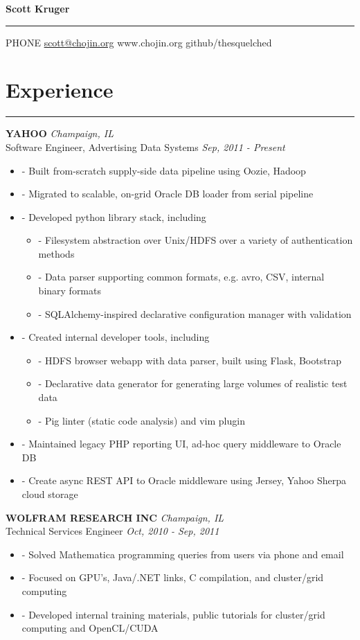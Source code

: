 \documentclass[a4paper,11pt]{article}
\newenvironment{pitemize}{
\begin{itemize}
\setlength{\itemsep}{.01in}
\setlength{\parskip}{.01in}
}
{\end{itemize}}
\begin{document}
\Huge{\textbf{Scott Kruger}}
\hrule
\vspace{0.05in}
\normalsize{
    PHONE \hfill \href{mailto:scott@chojin.org}{scott@chojin.org} 
    \hfill www.chojin.org \hfill github/thesquelched
}

\section*{\huge{Experience}}
\hrule
\vspace{0.1in}

\textbf{YAHOO} \hfill \textit{Champaign, IL} \\
Software Engineer, Advertising Data Systems \hfill \textit{Sep, 2011 - Present}
\begin{pitemize}
    \item[-]Built from-scratch supply-side data pipeline using Oozie, Hadoop
    \item[-]Migrated to scalable, on-grid Oracle DB loader from serial pipeline
    \item[-]Developed python library stack, including
    \begin{pitemize}
        \item[-]Filesystem abstraction over Unix/HDFS over a variety of authentication methods
        \item[-]Data parser supporting common formats, e.g. avro, CSV, internal binary formats
        \item[-]SQLAlchemy-inspired declarative configuration manager with validation
    \end{pitemize}
    \item[-]Created internal developer tools, including
    \begin{pitemize}
        \item[-]HDFS browser webapp with data parser, built using Flask, Bootstrap
        \item[-]Declarative data generator for generating large volumes of realistic test data
        \item[-]Pig linter (static code analysis) and vim plugin
    \end{pitemize}
    \item[-]Maintained legacy PHP reporting UI, ad-hoc query middleware to Oracle DB
    \item[-]Create async REST API to Oracle middleware using Jersey, Yahoo Sherpa cloud storage
\end{pitemize}

\vspace{0.2in}
\textbf{WOLFRAM RESEARCH INC} \hfill \textit{Champaign, IL} \\
Technical Services Engineer \hfill \textit{Oct, 2010 - Sep, 2011}
\begin{pitemize}
\item[-]Solved Mathematica programming queries from users via phone and email
\item[-]Focused on GPU's, Java/.NET links, C compilation, and cluster/grid computing
\item[-]Developed internal training materials, public tutorials for cluster/grid computing and OpenCL/CUDA
\end{pitemize}
\end{document}
